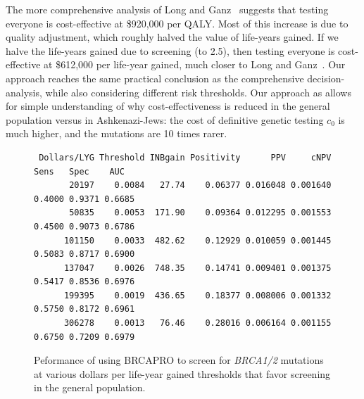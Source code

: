 \documentclass[AMA,STIX1COL]{WileyNJD-v2}
\begin{document}
The more comprehensive analysis of Long and Ganz~\cite{Long2015} suggests that testing everyone is cost-effective at \$920,000 per QALY.  Most of this increase is due to quality adjustment, which roughly halved the value of life-years gained.  If we halve the life-years gained due to screening (to 2.5), then testing everyone is cost-effective at \$612,000 per life-year gained, much closer to Long and Ganz~\cite{Long2015}.  Our approach reaches the same practical conclusion as the comprehensive decision-analysis, while also considering different risk thresholds.  Our approach as allows for simple understanding of why cost-effectiveness is reduced in the general population versus in Ashkenazi-Jews:  the cost of definitive genetic testing $c_0$ is much higher, and the mutations are 10 times rarer.

\begin{figure}[t!]
	\centering
	\begin{verbatim}
 Dollars/LYG Threshold INBgain Positivity      PPV     cNPV   Sens   Spec    AUC
       20197    0.0084   27.74    0.06377 0.016048 0.001640 0.4000 0.9371 0.6685
       50835    0.0053  171.90    0.09364 0.012295 0.001553 0.4500 0.9073 0.6786
      101150    0.0033  482.62    0.12929 0.010059 0.001445 0.5083 0.8717 0.6900
      137047    0.0026  748.35    0.14741 0.009401 0.001375 0.5417 0.8536 0.6976
      199395    0.0019  436.65    0.18377 0.008006 0.001332 0.5750 0.8172 0.6961
      306278    0.0013   76.46    0.28016 0.006164 0.001155 0.6750 0.7209 0.6979
	\end{verbatim}
	\caption{Peformance of using BRCAPRO to screen for \textit{BRCA1/2} mutations at various dollars per life-year gained thresholds that favor screening in the general population.}
\label{tab:dollarsperLYG}
\end{figure}
\end{document}
